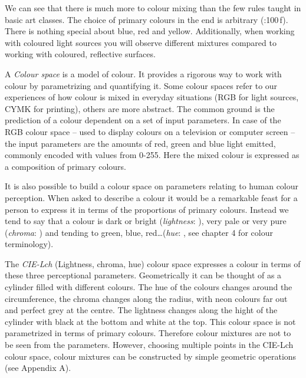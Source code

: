 \documentclass{scrartcl}
\begin{document}
We can see that there is much more to colour mixing than the few rules taught in basic art classes. The choice of primary colours in the end is arbitrary (\cite{Ware2013}:100\,f). There is nothing special about blue, red and yellow. Additionally, when working with coloured light sources you will observe different mixtures compared to working with coloured, reflective surfaces.

A \emph{Colour space} is a model of colour. It provides a rigorous way to work with colour by parametrizing and quantifying it. Some colour spaces refer to our experiences of how colour is mixed in everyday situations (RGB for light sources, CYMK for printing), others are more abstract. The common ground is the prediction of a colour dependent on a set of input parameters. In case of the RGB colour space -- used to display colours on a television or computer screen -- the input parameters are the amounts of red, green and blue light emitted, commonly encoded with values from 0-255. Here the mixed colour is expressed as a composition of primary colours.

It is also possible to build a colour space on parameters relating to human colour perception. When asked to describe a colour it would be a remarkable feast for a person to express it in terms of the proportions of primary colours. Instead we tend to say that a colour is dark or bright (\emph{lightness}:   ), very pale or very pure (\emph{chroma}:   ) and tending to green, blue, red\ldots (\emph{hue}:   , see \cite{Fairchild2005} chapter 4 for colour terminology).

The \emph{CIE-Lch} (Lightness, chroma, hue) colour space expresses a colour in terms of these three perceptional parameters. Geometrically it can be thought of as a cylinder filled with different colours. The hue of the colours changes around the circumference, the chroma changes along the radius, with neon colours far out and perfect grey at the centre. The lightness changes along the hight of the cylinder with black at the bottom and white at the top. This colour space is not parametrized in terms of primary colours. Therefore colour mixtures are not to be seen from the parameters. However, choosing multiple points in the CIE-Lch colour space, colour mixtures can be constructed by simple geometric operations (see Appendix A).
\end{document}
